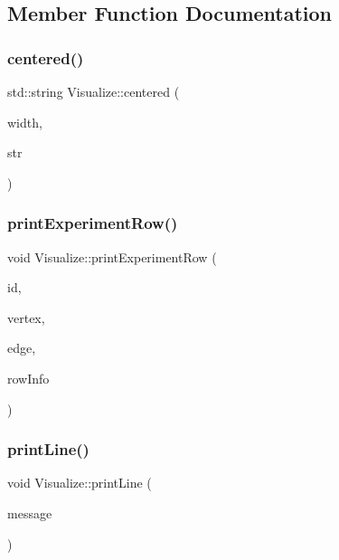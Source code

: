 \subsection{Member Function Documentation}
\mbox{\label{class_visualize_a9d34d81d684587b8b2b8bf70031f1670_a9d34d81d684587b8b2b8bf70031f1670}} 
\subsubsection{\texorpdfstring{centered()}{centered()}}
{\footnotesize\ttfamily std\+::string Visualize\+::centered (\begin{DoxyParamCaption}\item[{int}]{width,  }\item[{const std\+::string \&}]{str }\end{DoxyParamCaption})}

\mbox{\label{class_visualize_a52a0dfaf625bd3ac294a00e3161094cf_a52a0dfaf625bd3ac294a00e3161094cf}} 
\subsubsection{\texorpdfstring{print\+Experiment\+Row()}{printExperimentRow()}}
{\footnotesize\ttfamily void Visualize\+::print\+Experiment\+Row (\begin{DoxyParamCaption}\item[{int}]{id,  }\item[{int}]{vertex,  }\item[{int}]{edge,  }\item[{std\+::vector$<$ \hyperlink{struct_utility_structs_1_1_storage_items}{Utility\+Structs\+::\+Storage\+Items} $>$}]{row\+Info }\end{DoxyParamCaption})}

\mbox{\label{class_visualize_abce6cd538dc0715b21851e0bf0377d85_abce6cd538dc0715b21851e0bf0377d85}} 
\subsubsection{\texorpdfstring{print\+Line()}{printLine()}}
{\footnotesize\ttfamily void Visualize\+::print\+Line (\begin{DoxyParamCaption}\item[{std\+::string}]{message }\end{DoxyParamCaption})}

